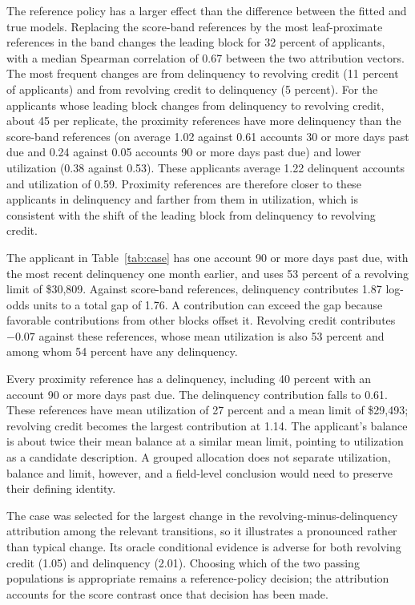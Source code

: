 The reference policy has a larger effect than the difference between the fitted and true models. Replacing the score-band references by the most leaf-proximate references in the band changes the leading block for 32 percent of applicants, with a median Spearman correlation of 0.67 between the two attribution vectors. The most frequent changes are from delinquency to revolving credit (11 percent of applicants) and from revolving credit to delinquency (5 percent). For the applicants whose leading block changes from delinquency to revolving credit, about 45 per replicate, the proximity references have more delinquency than the score-band references (on average 1.02 against 0.61 accounts 30 or more days past due and 0.24 against 0.05 accounts 90 or more days past due) and lower utilization (0.38 against 0.53). These applicants average 1.22 delinquent accounts and utilization of 0.59. Proximity references are therefore closer to these applicants in delinquency and farther from them in utilization, which is consistent with the shift of the leading block from delinquency to revolving credit.



The applicant in Table~\ref{tab:case} has one account 90 or more days past due, with the most recent delinquency one month earlier, and uses 53 percent of a revolving limit of \$30{,}809. Against score-band references, delinquency contributes 1.87 log-odds units to a total gap of 1.76. A contribution can exceed the gap because favorable contributions from other blocks offset it. Revolving credit contributes $-0.07$ against these references, whose mean utilization is also 53 percent and among whom 54 percent have any delinquency.

Every proximity reference has a delinquency, including 40 percent with an account 90 or more days past due. The delinquency contribution falls to 0.61. These references have mean utilization of 27 percent and a mean limit of \$29{,}493; revolving credit becomes the largest contribution at 1.14. The applicant's balance is about twice their mean balance at a similar mean limit, pointing to utilization as a candidate description. A grouped allocation does not separate utilization, balance and limit, however, and a field-level conclusion would need to preserve their defining identity.

The case was selected for the largest change in the revolving-minus-delinquency attribution among the relevant transitions, so it illustrates a pronounced rather than typical change. Its oracle conditional evidence is adverse for both revolving credit (1.05) and delinquency (2.01). Choosing which of the two passing populations is appropriate remains a reference-policy decision; the attribution accounts for the score contrast once that decision has been made.

